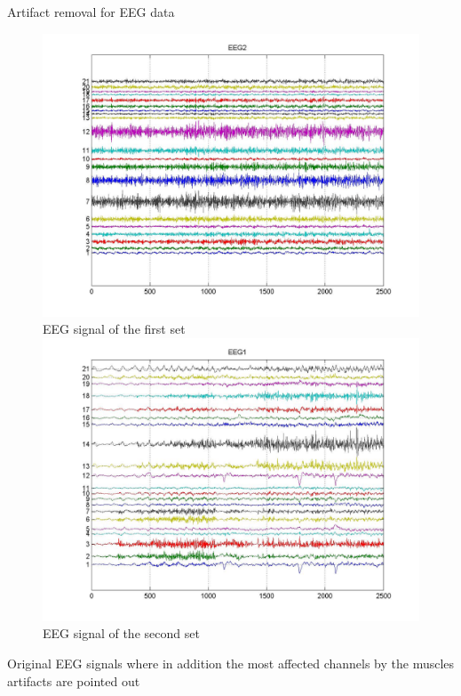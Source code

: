 \documentclass[t,12pt,english
\ifx\beamermode\undefined\else,\beamermode\fi
]{beamer}
\begin{document}
\begin{frame}{Artifact removal for EEG data}

\begin{figure}[!htbp]
%
\centering
\includegraphics[width=.8\textwidth]{1.jpg}\\
\tiny{\tiny EEG signal of the first set}
\endminipage\hfill
{}%
\centering
\includegraphics[width=.8\textwidth]{2.jpg}\\
\tiny{\tiny EEG signal of the second set}
\endminipage\hfill
\end{figure}

\tiny{Original EEG signals where in addition the most affected channels by the muscles artifacts are pointed out}

\end{frame}
\end{document}

